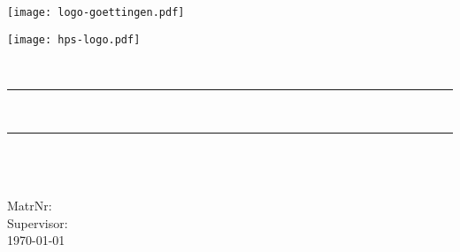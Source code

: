 
\begin{titlepage}
\begin{minipage}[t]{0.6\textwidth}
\begin{flushleft}
\texttt{[image: logo-goettingen.pdf]}
\end{flushleft}
\end{minipage}
\begin{minipage}[t]{0.4\textwidth}
\begin{center}
\qquad\texttt{[image: hps-logo.pdf]}
\end{center}
\end{minipage}

\begin{center}

\vspace*{.09\textheight}
\LARGE \thesistype\\[0.5cm]

\rule{.9\linewidth}{.6pt} \\[0.4cm] %
{\huge \bfseries \thesistitle}\vspace{0cm}
\rule{.9\linewidth}{.6pt} \\[1.5cm] %

\Large\authorname\\
\hfill\\
\large MatrNr:  \matrikelnumber\\ \vfill
Supervisor: \supervisor
\vfill
\university\\
\department
\vfill
{\large \today}\\[4cm] %

\vfill
\end{center}
\end{titlepage}